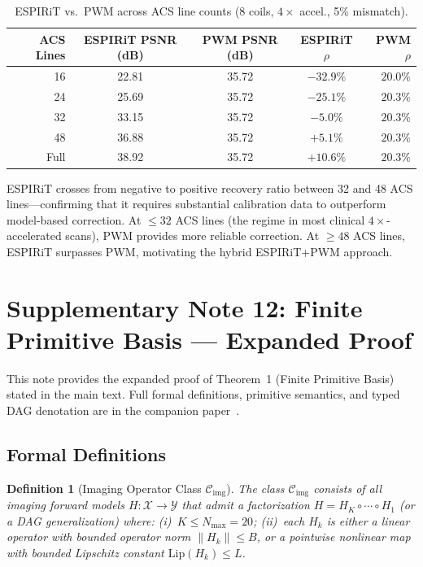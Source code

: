 \documentclass[11pt]{article}
\newtheorem{definition}{Definition}
\begin{document}
\begin{table}[ht]
\centering\small
\caption{ESPIRiT vs.\ PWM across ACS line counts (8 coils, $4\times$ accel., 5\% mismatch).}
\label{tab:espirit_extended}
\begin{tabular}{@{}rcccr@{}}
\toprule
ACS Lines & ESPIRiT PSNR (dB) & PWM PSNR (dB) & ESPIRiT $\rho$ & PWM $\rho$ \\
\midrule
16  & 22.81 & 35.72 & $-32.9\%$  & $20.0\%$ \\
24  & 25.69 & 35.72 & $-25.1\%$  & $20.3\%$ \\
32  & 33.15 & 35.72 & $-5.0\%$   & $20.3\%$ \\
48  & 36.88 & 35.72 & $+5.1\%$   & $20.3\%$ \\
Full & 38.92 & 35.72 & $+10.6\%$ & $20.3\%$ \\
\bottomrule
\end{tabular}
\end{table}

\noindent ESPIRiT crosses from negative to positive recovery ratio between 32 and 48 ACS lines---confirming that it requires substantial calibration data to outperform model-based correction. At $\leq 32$ ACS lines (the regime in most clinical $4\times$-accelerated scans), PWM provides more reliable correction. At $\geq 48$ ACS lines, ESPIRiT surpasses PWM, motivating the hybrid ESPIRiT+PWM approach.


\section{Supplementary Note 12: Finite Primitive Basis --- Expanded Proof}
\label{sec:fpb_proof}

This note provides the expanded proof of Theorem~1 (Finite Primitive Basis) stated in the main text. Full formal definitions, primitive semantics, and typed DAG denotation are in the companion paper~\cite{yang2026fpt}.

\subsection{Formal Definitions}

\begin{definition}[Imaging Operator Class $\mathcal{C}_{\mathrm{img}}$]
\label{def:ctier_supp}
The class $\mathcal{C}_{\mathrm{img}}$ consists of all imaging forward models $H: \mathcal{X} \to \mathcal{Y}$ that admit a factorization $H = H_K \circ \cdots \circ H_1$ (or a DAG generalization) where: (i)~$K \leq N_{\max} = 20$; (ii)~each $H_k$ is either a linear operator with bounded operator norm $\|H_k\| \leq B$, or a pointwise nonlinear map with bounded Lipschitz constant $\mathrm{Lip}(H_k) \leq L$.
\end{definition}
\end{document}
